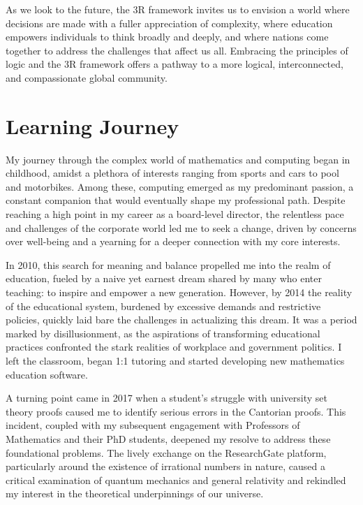 \documentclass[12pt]{article}
\begin{document}
As we look to the future, the 3R framework invites us to envision a world where decisions are made with a fuller appreciation of complexity, where education empowers individuals to think broadly and deeply, and where nations come together to address the challenges that affect us all. Embracing the principles of \qbit{} logic and the 3R framework offers a pathway to a more logical, interconnected, and compassionate global community.

\section*{Learning Journey}

My journey through the complex world of mathematics and computing began in childhood, amidst a plethora of interests ranging from sports and cars to pool and motorbikes. Among these, computing emerged as my predominant passion, a constant companion that would eventually shape my professional path. Despite reaching a high point in my career as a board-level director, the relentless pace and challenges of the corporate world led me to seek a change, driven by concerns over well-being and a yearning for a deeper connection with my core interests.

In 2010, this search for meaning and balance propelled me into the realm of education, fueled by a naive yet earnest dream shared by many who enter teaching: to inspire and empower a new generation. However, by 2014 the reality of the educational system, burdened by excessive demands and restrictive policies, quickly laid bare the challenges in actualizing this dream. It was a period marked by disillusionment, as the aspirations of transforming educational practices confronted the stark realities of workplace and government politics. I left the classroom, began 1:1 tutoring and started developing new mathematics education software.

A turning point came in 2017 when a student's struggle with university set theory proofs caused me to identify serious errors in the Cantorian proofs. This incident, coupled with my subsequent engagement with Professors of Mathematics and their PhD students, deepened my resolve to address these foundational problems. The lively exchange on the ResearchGate platform, particularly around the existence of irrational numbers in nature, caused a critical examination of quantum mechanics and general relativity and rekindled my interest in the theoretical underpinnings of our universe.
\end{document}
